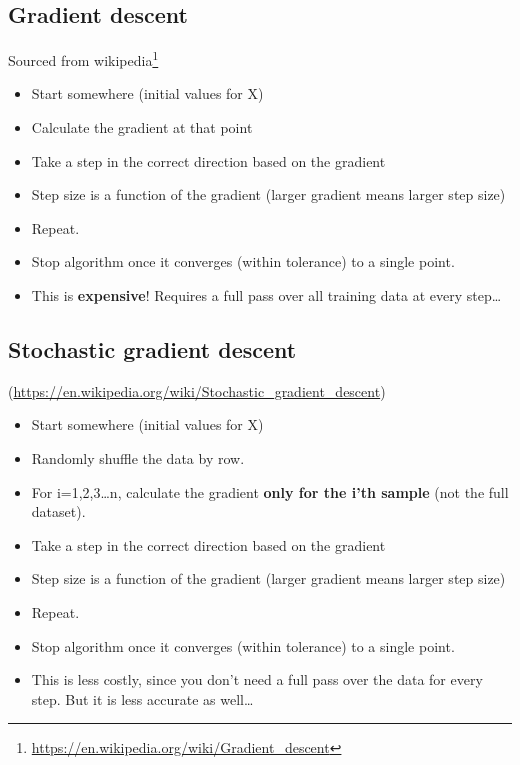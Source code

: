 \documentclass[fontset=fandol,zihao=false,scheme=chinese,heading=true,UTF8]{ctexbook}
\providecommand{\tightlist}{%
  \setlength{\itemsep}{0pt}\setlength{\parskip}{0pt}}
\renewcommand{\href}[2]{#2\footnote{\url{#1}}}
\begin{document}
\hypertarget{gradient-descent}{%
\subsection{Gradient descent}\label{gradient-descent}}

\href{https://en.wikipedia.org/wiki/Gradient_descent}{Sourced from wikipedia}

\begin{itemize}
\tightlist
\item
  Start somewhere (initial values for X)
\item
  Calculate the gradient at that point
\item
  Take a step in the correct direction based on the gradient
\item
  Step size is a function of the gradient (larger gradient means larger step size)
\item
  Repeat.
\item
  Stop algorithm once it converges (within tolerance) to a single point.
\item
  This is \textbf{expensive}! Requires a full pass over all training data at every step\ldots{}
\end{itemize}

\hypertarget{stochastic-gradient-descent}{%
\subsection{Stochastic gradient descent}\label{stochastic-gradient-descent}}

(\url{https://en.wikipedia.org/wiki/Stochastic_gradient_descent})

\begin{itemize}
\tightlist
\item
  Start somewhere (initial values for X)
\item
  Randomly shuffle the data by row.
\item
  For i=1,2,3\ldots{}n, calculate the gradient \textbf{only for the i'th sample} (not the full dataset).
\item
  Take a step in the correct direction based on the gradient
\item
  Step size is a function of the gradient (larger gradient means larger step size)
\item
  Repeat.
\item
  Stop algorithm once it converges (within tolerance) to a single point.
\item
  This is less costly, since you don't need a full pass over the data for every step. But it is less accurate as well\ldots{}
\end{itemize}
\end{document}
